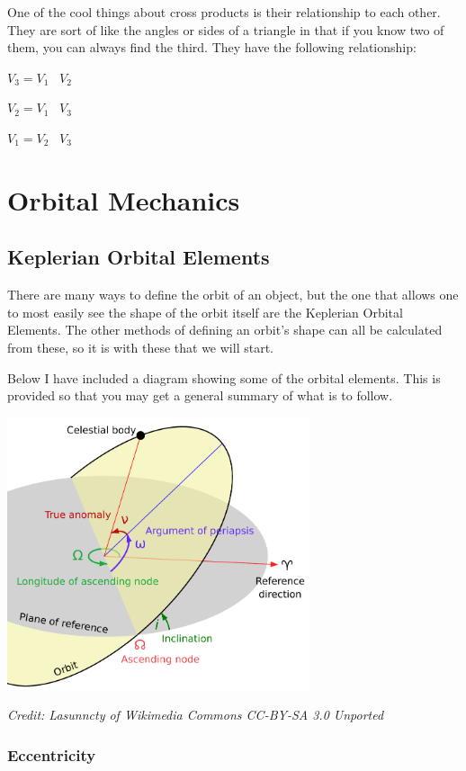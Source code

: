 \documentclass[]{book}
\begin{document}
One of the cool things about cross products is their relationship to each
other.  They are sort of like the angles or sides of a triangle in that if
you know two of them, you can always find the third.  They have the
following relationship:

\bigskip
$V_{3} = V_{1}$ \texttimes\ $V_{2}$

$V_{2} = V_{1}$ \texttimes\ $V_{3}$

$V_{1} = V_{2}$ \texttimes\ $V_{3}$
\bigskip

\part{Orbital Mechanics}

\chapter{Keplerian Orbital Elements}

There are many ways to define the orbit of an object, but the one that
allows one to most easily see the shape of the orbit itself are the
Keplerian Orbital Elements.  The other methods of defining an orbit's
shape can all be calculated from these, so it is with these that we will
start.

Below I have included a diagram showing some of the orbital elements. This
is provided so that you may get a general summary of what is to follow.

\bigskip
\includegraphics[width=3.5in]{images/Orbit1}

\textit{Credit: Lasunncty of Wikimedia Commons CC-BY-SA 3.0 Unported}
\bigskip

\section{Eccentricity}
\end{document}
